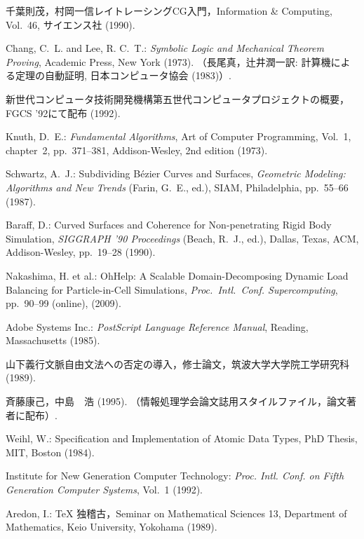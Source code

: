 \begin{thebibliography}{10}
千葉則茂，村岡一信\：レイトレーシングCG入門，Information {\&} Computing,
  Vol.~46, サイエンス社 (1990).

Chang, C.~L. and Lee, R. C.~T.: {\em Symbolic Logic and Mechanical Theorem
  Proving}, Academic Press, New York (1973).
\newblock （長尾真，辻井潤一訳: 計算機による定理の自動証明,
  日本コンピュータ協会 (1983)）.

新世代コンピュータ技術開発機構\：第五世代コンピュータプロジェクトの概要，{FGCS%
'92}にて配布 (1992).

Knuth, D.~E.: {\em Fundamental Algorithms}, Art of Computer Programming,
  Vol.~1, chapter~2, pp.\ 371--381, Addison-Wesley, 2nd edition (1973).

Schwartz, A.~J.: Subdividing B{\'e}zier Curves and Surfaces, {\em Geometric
  Modeling: Algorithms and New Trends} (Farin, G.~E., ed.), SIAM, Philadelphia,
  pp.\ 55--66 (1987).

Baraff, D.: Curved Surfaces and Coherence for Non-penetrating Rigid Body
  Simulation, {\em SIGGRAPH '90 Proceedings} (Beach, R.~J., ed.), Dallas,
  Texas, ACM, Addison-Wesley, pp.\ 19--28 (1990).

Nakashima, H. et al.: OhHelp: A Scalable Domain-Decomposing Dynamic Load
  Balancing for Particle-in-Cell Simulations, {\em Proc.\ Intl.\ Conf.
  Supercomputing}, pp.\ 90--99 (online),
   (2009).

Adobe Systems Inc.: {\em PostScript Language Reference Manual}, Reading,
  Massachusetts (1985).

山下義行\：文脈自由文法への否定の導入，修士論文，筑波大学大学院工学研究科
  (1989).

斉藤康己，中島　浩 (1995).
\newblock （情報処理学会論文誌用スタイルファイル，論文著者に配布）.

Weihl, W.: Specification and Implementation of Atomic Data Types, PhD Thesis,
  MIT, Boston (1984).

Institute for New Generation Computer Technology: {\em Proc. Intl. Conf. on
  Fifth Generation Computer Systems}, Vol.~1 (1992).

Aredon, I.: {\TeX} 独稽古，Seminar on Mathematical Sciences 13, Department of
  Mathematics, Keio University, Yokohama (1989).


\end{thebibliography}
